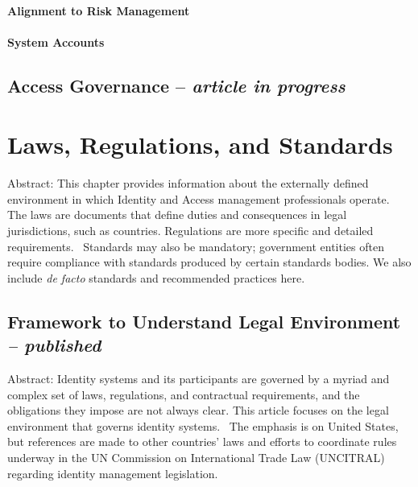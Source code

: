 \hypertarget{alignment-to-risk-management}{%
\subsubsection{Alignment to Risk
Management}\label{alignment-to-risk-management}}

\hypertarget{system-accounts}{%
\subsubsection{System Accounts}\label{system-accounts}}

\hypertarget{access-governance-article-in-progress}{%
\section{\texorpdfstring{Access Governance -- \emph{article in
progress}}{Access Governance -- article in progress}}\label{access-governance-article-in-progress}}

\hypertarget{laws-regulations-and-standards}{%
\chapter{Laws, Regulations, and
Standards}\label{laws-regulations-and-standards}}

Abstract: This chapter provides information about the externally defined
environment in which Identity and Access management professionals
operate.~ The laws are documents that define duties and consequences in
legal jurisdictions, such as countries. Regulations are more specific
and detailed requirements.~ Standards may also be mandatory; government
entities often require compliance with standards produced by certain
standards bodies. We also include \emph{de facto} standards and
recommended practices here.

\hypertarget{framework-to-understand-legal-environment-published}{%
\section{\texorpdfstring{Framework to Understand Legal Environment
\emph{--
published}}{Framework to Understand Legal Environment -- published}}\label{framework-to-understand-legal-environment-published}}

Abstract: Identity systems and its participants are governed by a myriad
and complex set of laws, regulations, and contractual requirements, and
the obligations they impose are not always clear. This article focuses
on the legal environment that governs identity systems.~ The emphasis is
on United States, but references are made to other countries' laws and
efforts to coordinate rules underway in the UN Commission on
International Trade Law (UNCITRAL) regarding identity management
legislation.

